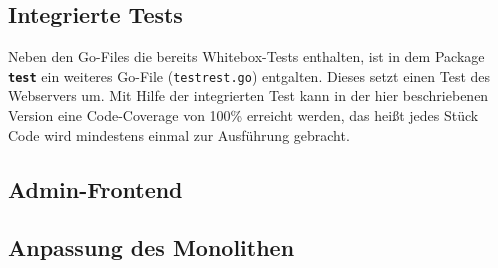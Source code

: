 \subsection{Integrierte Tests}
\label{subsec: Integrierte Test}
Neben den Go-Files die bereits Whitebox-Tests enthalten, ist in dem Package \textbf{\texttt{test}} ein weiteres Go-File (\texttt{testrest.go}) entgalten. Dieses setzt einen Test des Webservers um. Mit Hilfe der integrierten Test kann in der hier beschriebenen Version eine Code-Coverage von 100\% erreicht werden, das heißt jedes Stück Code wird mindestens einmal zur Ausführung gebracht.

\subsection{Admin-Frontend}
\label{subsec: Admin-Frontend}



\subsection{Anpassung des Monolithen}
\label{subsec: Anpassung des Monolithen}